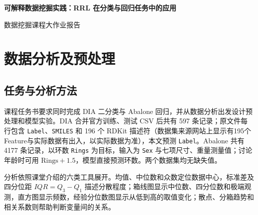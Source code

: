 \documentclass[UTF8,a4paper,11pt]{ctexart}
\begin{document}
\begin{center}
{\LARGE\bfseries 可解释数据挖掘实践：RRL 在分类与回归任务中的应用\par}
\vspace{0.55em}
{\large 数据挖掘课程大作业报告\par}
\end{center}
\vspace{0.2em}

\begin{abstract}
本文完成药物诱导自身免疫预测（DIA）和鲍鱼环数预测（Abalone）两项任务，依次报告数据分析及预处理、模型训练、模型结构优化和对比分析。每项任务都比较手写线性模型、随机森林和规则表征学习器 RRL。DIA 的 597 条记录中阳性占 24.8\%，196 个数值描述符兼有稀疏、长尾和局部高度相关的特点；优化后的 RRL 在外层五折获得阳性 F1 $0.609$，高于随机森林的 $0.503$。Abalone 的 4177 条记录呈现连续尺寸趋势、强共线性和稀少的高环数样本；纯规则 RRL 的两个训练种子得到 RMSE $2.194$、$2.205$ 环，优于 Ridge 的 $2.224$ 环，随机森林仍以 $2.147$ 环领先。逐轮消融说明：DIA 的主要进步来自规则结构与训练配置的联合选择；Abalone 的连续分支虽能改善预测，却会掩盖规则自身的作用，因此最终回到纯规则主线。报告同时检查规则长度、覆盖率及导出规则与实际预测的一致性。
\end{abstract}

\setcounter{tocdepth}{1}
\tableofcontents

\section{数据分析及预处理}
\subsection{任务与分析方法}

课程任务书要求同时完成 DIA 二分类与 Abalone 回归，并从数据分析出发设计预处理和模型实验。DIA\cite{uci-dia} 合并官方训练、测试 CSV 后共有 597 条记录；原文件每行包含 \texttt{Label}、\texttt{SMILES} 和 196 个 RDKit 描述符（数据集来源网站上显示有195个Feature与实际数据有出入，以实际数据为准），本文预测 \texttt{Label}。Abalone\cite{uci-abalone} 共有 4177 条记录，以环数 \texttt{Rings} 为目标，输入为 \texttt{Sex} 与七项尺寸、重量测量值；讨论年龄时可用 $\mathrm{Rings}+1.5$，模型直接预测环数。两个数据集均无缺失值。

分析依照课堂介绍的六类工具展开。均值、中位数和众数定位数据中心，标准差及四分位距 $IQR=Q_3-Q_1$ 描述分散程度；箱线图显示中位数、四分位数和极端观测，直方图显示频数，经验分位数图显示从低到高的取值变化；散点、分箱趋势和相关系数则帮助判断变量间的关系。
\end{document}
